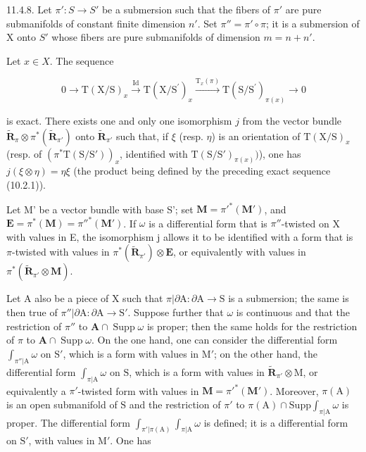 11.4.8. Let \(\pi': S \to S'\) be a submersion such that the fibers of \(\pi'\) are pure submanifolds of constant finite dimension \(n'\). Set \(\pi'' = \pi' \circ \pi\); it is a submersion of X onto \(S'\) whose fibers are pure submanifolds of dimension \(m = n + n'\).

Let \(x\in X\). The sequence

\[
0 \longrightarrow \mathrm{T} (\mathrm{X} / \mathrm{S}) _ {x} \stackrel {\mathrm{Id}} {\longrightarrow} \mathrm{T} (\mathrm{X} / \mathrm{S} ^ {\prime}) _ {x} \stackrel {\mathrm{T} _ {x} (\pi)} {\longrightarrow} \mathrm{T} (\mathrm{S} / \mathrm{S} ^ {\prime}) _ {\pi (x)} \longrightarrow 0
\]

is exact. There exists one and only one isomorphism \(j\) from the vector bundle \(\tilde{\mathbf{R}}_{\pi} \otimes \pi^{*}(\tilde{\mathbf{R}}_{\pi'})\) onto \(\tilde{\mathbf{R}}_{\pi'}\) such that, if \(\xi\) (resp. \(\eta\)) is an orientation of \(\mathrm{T}(\mathrm{X}/\mathrm{S})_x\) (resp. of \((\pi^{*}\mathrm{T}(\mathrm{S}/\mathrm{S}'))_x\), identified with \(\mathrm{T}(\mathrm{S}/\mathrm{S}')_{\pi(x)})\)), one has \(j(\xi \otimes \eta) = \eta\xi\) (the product being defined by the preceding exact sequence (10.2.1)).

Let M' be a vector bundle with base S'; set \(\mathbf{M} = \pi'^{*}(\mathbf{M}')\), and \(\mathbf{E}=\pi^{*}(\mathbf{M})=\pi''^{*}(\mathbf{M}')\). If \(\omega\) is a differential form that is \(\pi''\)-twisted on X with values in E, the isomorphism j allows it to be identified with a form that is \(\pi\)-twisted with values in \(\pi^{*}(\tilde{\mathbf{R}}_{\pi'}) \otimes \mathbf{E}\), or equivalently with values in \(\pi^{*}(\tilde{\mathbf{R}}_{\pi'} \otimes \mathbf{M})\).

Let A also be a piece of X such that \(\pi|\partial\mathrm{A}:\partial\mathrm{A}\to\mathrm{S}\) is a submersion; the same is then true of \(\pi''|\partial\mathrm{A}:\partial\mathrm{A}\to\mathrm{S}'\). Suppose further that \(\omega\) is continuous and that the restriction of \(\pi''\) to \(\mathbf{A}\cap\operatorname{Supp}\omega\) is proper; then the same holds for the restriction of \(\pi\) to \(\mathbf{A}\cap\operatorname{Supp}\omega\). On the one hand, one can consider the differential form \(\int_{\pi''|\mathrm{A}}\omega\) on \(\mathrm{S}'\), which is a form with values in \(\mathrm{M}'\); on the other hand, the differential form \(\int_{\pi|\mathrm{A}}\omega\) on \(\mathrm{S}\), which is a form with values in \(\tilde{\mathbf{R}}_{\pi'}\otimes\mathrm{M}\), or equivalently a \(\pi'\)-twisted form with values in \(\mathbf{M}=\pi'^{*}(\mathbf{M}')\). Moreover, \(\pi(\mathrm{A})\) is an open submanifold of \(\mathrm{S}\) and the restriction of \(\pi'\) to \(\pi(\mathrm{A})\cap\mathrm{Supp}\int_{\pi|\mathrm{A}}\omega\) is proper. The differential form \(\int_{\pi'|\pi(\mathrm{A})}\int_{\pi|\mathrm{A}}\omega\) is defined; it is a differential form on \(\mathrm{S}'\), with values in \(\mathrm{M}'\). One has

